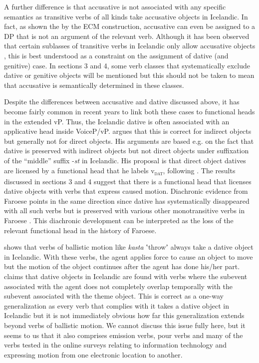 \documentclass[output=paper,modfonts,nonflat,colorlinks,citecolor=brown]{langsci/langscibook}
\begin{document}
A further difference is that accusative is not associated with any specific semantics as transitive verbs of all kinds take accusative objects in Icelandic. In fact, as shown the by the ECM construction, accusative can even be assigned to a DP that is not an argument of the relevant verb. Although it has been observed that certain sublasses of transitive verbs in Icelandic only allow accusative objects \citep{Jónsson2013a}, this is best understood as a constraint on the assignment of dative (and genitive) case. In sections 3 and 4, some verb classes that systematically exclude dative or genitive objects will be mentioned but this should not be taken to mean that accusative is semantically determined in these classes.

Despite the differences between accusative and dative discussed above, it has become fairly common in recent years to link both these cases to functional heads in the extended vP. Thus, the Icelandic dative is often associated with an applicative head inside VoiceP/vP. \citet[128-138]{Wood2015} argues that this is correct for indirect objects but generally not for direct objects. His arguments are based e.g. on the fact that dative is preserved with indirect objects but not direct objects under suffixation of the “middle” suffix -\textit{st} in Icelandic. His proposal is that direct object datives are licensed by a functional head that he labels v\textsc{\textsubscript{dat}}, following \citet{Svenonius2006alternations}. The results discussed in sections 3 and 4 suggest that there is a functional head that licenses dative objects with verbs that express caused motion. Diachronic evidence from Faroese points in the same direction since dative has systematically disappeared with all such verbs but is preserved with various other monotransitive verbs in Faroese \citep{Jónsson2009}. This diachronic development can be interpreted as the loss of the relevant functional head in the history of Faroese.

\citet{Svenonius2002} shows that verbs of ballistic motion like \textit{kasta} ʽthrowʼ always take a dative object in Icelandic. With these verbs, the agent applies force to cause an object to move but the motion of the object continues after the agent has done his/her part. \citet{Svenonius2002} claims that dative objects in Icelandic are found with verbs where the subevent associated with the agent does not completely overlap temporally with the subevent associated with the theme object. This is correct as a one-way generalization as every verb that complies with it takes a dative object in Icelandic but it is not immediately obvious how far this generalization extends beyond verbs of ballistic motion. We cannot discuss this issue fully here, but it seems to us that it also comprises emission verbs, pour verbs and many of the verbs tested in the online surveys relating to information technology and expressing motion from one electronic location to another. 
\end{document}
